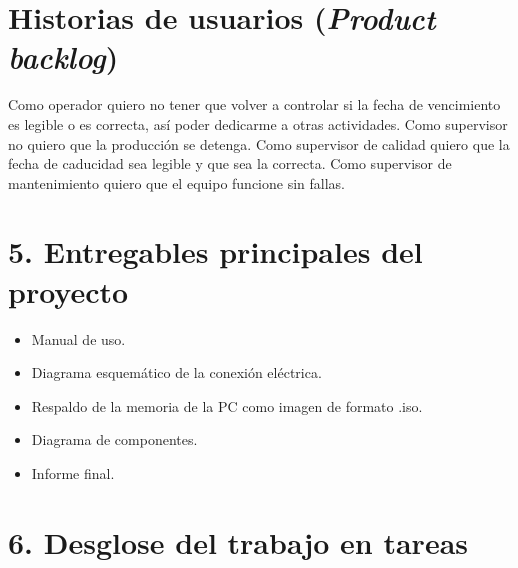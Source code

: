 \documentclass[11pt]{charter}
\begin{document}

\section{Historias de usuarios (\textit{Product backlog})}
\label{sec:backlog}


Como operador quiero no tener que volver a controlar si la fecha de vencimiento es legible o es correcta, así poder dedicarme a otras actividades.\newline
Como supervisor no quiero que la producción se detenga. \newline
Como supervisor de calidad quiero que la fecha de caducidad sea legible y que sea la correcta.\newline
Como supervisor de mantenimiento quiero que el equipo funcione sin fallas. 



\section{5. Entregables principales del proyecto}
\label{sec:entregables}

\begin{itemize}
\item Manual de uso.
\item Diagrama esquemático de la conexión eléctrica. 
\item Respaldo de la memoria de la PC como imagen de formato .iso.
\item Diagrama de componentes.
\item Informe final.

\end{itemize}

\newpage
\section{6. Desglose del trabajo en tareas}
\label{sec:wbs}

\end{document}
